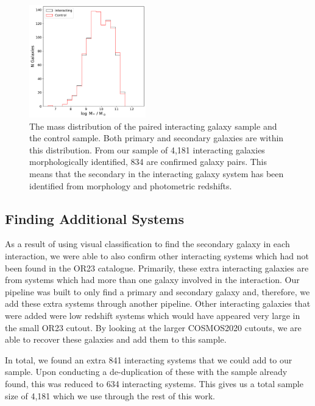 \begin{figure}
    \centering
    \includegraphics[width=0.45\textwidth]{Chapter3/figures/mass-matching-pairs.pdf}
    \caption{The mass distribution of the paired interacting galaxy sample and the control sample. Both primary and secondary galaxies are within this distribution. From our sample of 4,181 interacting galaxies morphologically identified, 834 are confirmed galaxy pairs. This means that the secondary in the interacting galaxy system has been identified from morphology and photometric redshifts.}
    \label{fig:matched-distributions}
\end{figure}

\subsection{Finding Additional Systems}
\noindent As a result of using visual classification to find the secondary galaxy in each interaction, we were able to also confirm other interacting systems which had not been found in the OR23 catalogue. Primarily, these extra interacting galaxies are from systems which had more than one galaxy involved in the interaction. Our pipeline was built to only find a primary and secondary galaxy and, therefore, we add these extra systems through another pipeline. Other interacting galaxies that were added were low redshift systems which would have appeared very large in the small OR23 cutout. By looking at the larger COSMOS2020 cutouts, we are able to recover these galaxies and add them to this sample.

In total, we found an extra 841 interacting systems that we could add to our sample. Upon conducting a de-duplication of these with the sample already found, this was reduced to 634 interacting systems. This gives us a total sample size of 4,181 which we use through the rest of this work.

